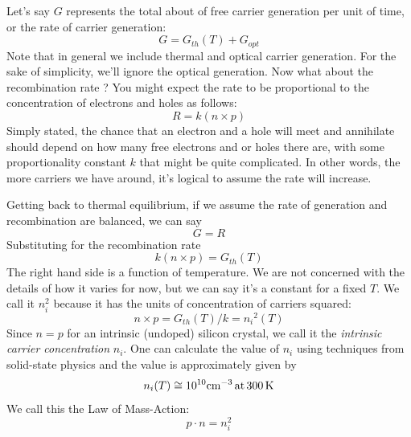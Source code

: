 Let’s say $G$ represents the total about of free carrier generation per unit of time, or the rate of carrier generation:
\begin{equation} G = {G_{th}}(T) + {G_{opt}} \end{equation}
Note that in general we include thermal and optical carrier generation.  For the sake of simplicity, we’ll ignore the optical generation.  Now what about the recombination rate ?  You might expect the rate to be proportional to the concentration of electrons and holes as follows:
\begin{equation} R = k(n \times p) \end{equation}
Simply stated, the chance that an electron and a hole will meet and annihilate should depend on how many free electrons and or holes there are, with some proportionality constant $k$ that might be quite complicated.  In other words, the more carriers we have around, it’s logical to assume the rate will increase. 

Getting back to thermal equilibrium, if we assume the rate of generation and recombination are balanced, we can say
\begin{equation} G = R \end{equation}
Substituting for the recombination rate
\begin{equation} k(n \times p) = {G_{th}}(T) \end{equation}
The right hand side is a function of temperature.  We are not concerned with the details of how it varies for now, but we can say it’s a constant for a fixed $T$.  We call it $n_i^2$ because it has the units of concentration of carriers squared:
\begin{equation} n \times p = {G_{th}}(T)/k = {n_i}^2(T) \end{equation}
Since $n=p$ for an intrinsic (undoped) silicon crystal, we call it the \emph{intrinsic carrier concentration} $n_i$.  One can calculate the value of $n_i$ using techniques from solid-state physics and the value is approximately given by 
\begin{equation} {n_i}(T) \cong {10^{10}}{\rm{c}}{{\rm{m}}^{ - 3}}\,{\rm{at}}\,300\,{\rm{K}}
\end{equation}
We call this the Law of Mass-Action:
\begin{equation}
        p \cdot n = n_i^2
\end{equation}
